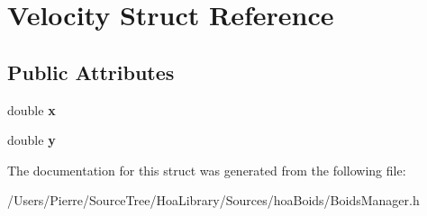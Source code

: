 \hypertarget{struct_velocity}{\section{Velocity Struct Reference}
\label{struct_velocity}
}
\subsection*{Public Attributes}
\begin{DoxyCompactItemize}
\item 
\hypertarget{struct_velocity_a99a9f9580c8a025a2c7a18890993b56a}{double {\bfseries x}}\label{struct_velocity_a99a9f9580c8a025a2c7a18890993b56a}

\item 
\hypertarget{struct_velocity_ae1282d20e14cc4be4aac24ab4e1e3e5c}{double {\bfseries y}}\label{struct_velocity_ae1282d20e14cc4be4aac24ab4e1e3e5c}

\end{DoxyCompactItemize}


The documentation for this struct was generated from the following file\-:\begin{DoxyCompactItemize}
\item 
/\-Users/\-Pierre/\-Source\-Tree/\-Hoa\-Library/\-Sources/hoa\-Boids/Boids\-Manager.\-h\end{DoxyCompactItemize}

